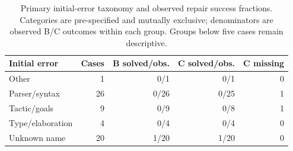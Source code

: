 \begin{table}[t]
\centering
\caption{Primary initial-error taxonomy and observed repair success fractions. Categories are pre-specified and mutually exclusive; denominators are observed B/C outcomes within each group. Groups below five cases remain descriptive.}
\label{tab:errors}
\small
\begin{tabular}{lrrrr}
\toprule
Initial error & Cases & B solved/obs. & C solved/obs. & C missing \\
\midrule
Other & 1 & 0/1 & 0/1 & 0 \\
Parser/syntax & 26 & 0/26 & 0/25 & 1 \\
Tactic/goals & 9 & 0/9 & 0/8 & 1 \\
Type/elaboration & 4 & 0/4 & 0/4 & 0 \\
Unknown name & 20 & 1/20 & 1/20 & 0 \\
\bottomrule
\end{tabular}
\end{table}
